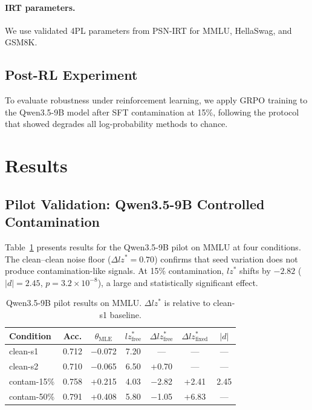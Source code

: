 \documentclass[11pt]{article}
\begin{document}
\paragraph{IRT parameters.} We use validated 4PL parameters from PSN-IRT \citep{psnirt2026} for MMLU, HellaSwag, and GSM8K.

\subsection{Post-RL Experiment}

To evaluate robustness under reinforcement learning, we apply GRPO training to the Qwen3.5-9B model after SFT contamination at 15\%, following the protocol that \citet{wang2025rl} showed degrades all log-probability methods to chance.

\section{Results}
\label{sec:results}

\subsection{Pilot Validation: Qwen3.5-9B Controlled Contamination}
\label{sec:pilot}

Table~\ref{tab:pilot} presents results for the Qwen3.5-9B pilot on MMLU at four conditions.
The clean--clean noise floor ($\Delta lz^* = 0.70$) confirms that seed variation does not produce contamination-like signals.
At 15\% contamination, $lz^*$ shifts by $-2.82$ ($|d| = 2.45$, $p = 3.2 \times 10^{-8}$), a large and statistically significant effect.

\begin{table}[t]
\centering
\caption{Qwen3.5-9B pilot results on MMLU. $\Delta lz^*$ is relative to clean-s1 baseline.}
\label{tab:pilot}
\small
\begin{tabular}{lcccccc}
\toprule
Condition & Acc. & $\theta_{\text{MLE}}$ & $lz^*_{\text{free}}$ & $\Delta lz^*_{\text{free}}$ & $\Delta lz^*_{\text{fixed}}$ & $|d|$ \\
\midrule
clean-s1 & 0.712 & $-$0.072 & 7.20 & --- & --- & --- \\
clean-s2 & 0.710 & $-$0.065 & 6.50 & +0.70 & --- & --- \\
contam-15\% & 0.758 & +0.215 & 4.03 & $-$2.82 & +2.41 & 2.45 \\
contam-50\% & 0.791 & +0.408 & 5.80 & $-$1.05 & +6.83 & --- \\
\bottomrule
\end{tabular}
\end{table}
\end{document}
